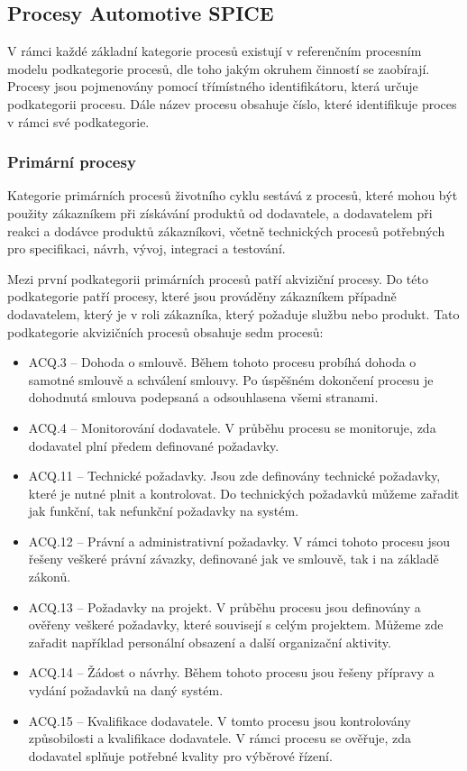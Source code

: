 \documentclass[czech,master,public,dept460,male,cpdeclaration,oneside]{diploma}
\begin{document}

\subsection{Procesy Automotive SPICE}
\label{sec:aspice_processes}
V rámci každé základní kategorie procesů existují v referenčním procesním modelu podkategorie procesů, dle toho jakým okruhem činností se zaobírají. Procesy jsou pojmenovány pomocí třímístného identifikátoru, která určuje podkategorii procesu. Dále název procesu obsahuje číslo, které identifikuje proces v rámci své podkategorie.

\subsubsection{Primární procesy}
Kategorie primárních procesů životního cyklu sestává z procesů, které mohou být použity zákazníkem při získávání produktů od dodavatele, a dodavatelem při reakci a dodávce produktů zákazníkovi, včetně technických procesů potřebných pro specifikaci, návrh, vývoj, integraci a testování.

Mezi první podkategorii primárních procesů patří akviziční procesy. Do této podkategorie patří procesy, které jsou prováděny zákazníkem případně dodavatelem, který je v roli zákazníka, který požaduje  službu nebo produkt. Tato podkategorie akvizičních procesů obsahuje sedm procesů:

\begin{itemize}
	\item ACQ.3 -- Dohoda o smlouvě. Během tohoto procesu probíhá dohoda o samotné smlouvě a schválení smlouvy. Po úspěšném dokončení procesu je dohodnutá smlouva podepsaná a odsouhlasena všemi stranami.
	\item ACQ.4 -- Monitorování dodavatele. V průběhu procesu se monitoruje, zda dodavatel plní předem definované požadavky.
	\item ACQ.11 -- Technické požadavky. Jsou zde definovány technické požadavky, které je nutné plnit a kontrolovat. Do technických požadavků můžeme zařadit jak funkční, tak nefunkční požadavky na systém.
	\item ACQ.12 -- Právní a administrativní požadavky. V rámci tohoto procesu jsou řešeny veškeré právní závazky, definované jak ve smlouvě, tak i  na základě zákonů.
	\item ACQ.13 -- Požadavky na projekt. V průběhu procesu jsou definovány a ověřeny veškeré požadavky, které souvisejí s celým projektem. Můžeme zde zařadit například personální obsazení a další organizační aktivity.
	\item ACQ.14 -- Žádost o návrhy.  Během tohoto procesu jsou řešeny přípravy a vydání požadavků na daný systém.
	\item ACQ.15 -- Kvalifikace dodavatele. V tomto procesu jsou kontrolovány způsobilosti a kvalifikace dodavatele. V rámci procesu se ověřuje, zda dodavatel splňuje potřebné kvality pro výběrové řízení.
\end{itemize}
\end{document}
